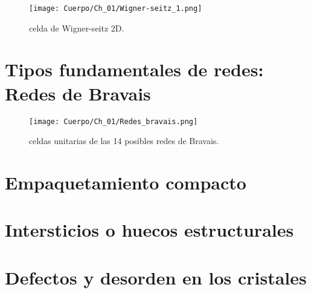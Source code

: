 \begin{figure}[h!] \centering
    \texttt{[image: Cuerpo/Ch\_01/Wigner-seitz\_1.png]}
    \caption{celda de Wigner-seitz 2D.}
    \label{Fig:01-01}
\end{figure}

 \section{Tipos fundamentales de redes: Redes de Bravais}

\begin{figure}[h!] \centering
    \texttt{[image: Cuerpo/Ch\_01/Redes\_bravais.png]}
    \caption{celdas unitarias de las 14 posibles redes de Bravais.}
    \label{Fig:01-02}
\end{figure}

\section{Empaquetamiento compacto}

\section{Intersticios o huecos estructurales}

\section{Defectos y desorden en los cristales}